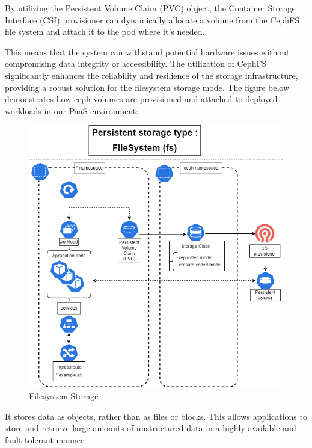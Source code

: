 \hspace{7mm}By utilizing the Persistent Volume Claim (PVC) object, the Container Storage Interface (CSI) provisioner can dynamically allocate a volume from the CephFS file system and attach it to the pod where it's needed.

\hspace{7mm}This means that the system can withstand potential hardware issues without compromising data integrity or accessibility. The utilization of CephFS significantly enhances the reliability and resilience of the storage infrastructure, providing a robust solution for the filesystem storage mode.
\newpage
\hspace{7mm}The figure below demonstrates how ceph volumes are provisioned and attached to deployed workloads in our PaaS environment:

\begin{figure}[H]\centering
\includegraphics[width=1.0\textwidth,angle=00]{assets/f31.png}
\caption{Filesystem Storage}
\label{fig:Filesystem Storage}
\end{figure}


\hspace{7mm}It stores data as objects, rather than as files or blocks. This allows applications to store and retrieve large amounts of unstructured data in a highly available and fault-tolerant manner.

